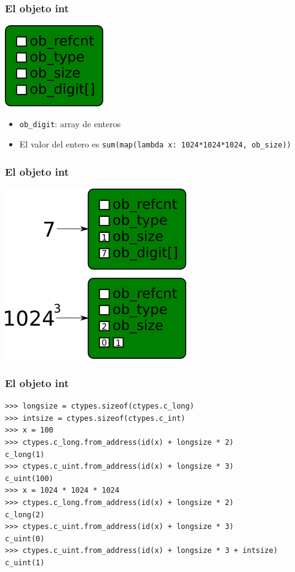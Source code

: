 \documentclass[10pt]{beamer}
\begin{document}
  \begin{frame}[containsverbatim]
    \frametitle{El objeto int}
    \begin{center}\includegraphics{img/Int.png}\end{center}
    \begin{itemize}
      \item \verb+ob_digit+: array de enteros
      \item El valor del entero es \verb+sum(map(lambda x: 1024*1024*1024, ob_size))+
    \end{itemize}
  \end{frame}

  \begin{frame}[containsverbatim]
    \frametitle{El objeto int}
    \begin{center}\includegraphics{img/Int-Usage.png}\end{center}
  \end{frame}

  \begin{frame}[containsverbatim]
    \frametitle{El objeto int}
    \begin{verbatim}
>>> longsize = ctypes.sizeof(ctypes.c_long)
>>> intsize = ctypes.sizeof(ctypes.c_int)
>>> x = 100
>>> ctypes.c_long.from_address(id(x) + longsize * 2)
c_long(1)
>>> ctypes.c_uint.from_address(id(x) + longsize * 3)
c_uint(100)
>>> x = 1024 * 1024 * 1024
>>> ctypes.c_long.from_address(id(x) + longsize * 2)
c_long(2)
>>> ctypes.c_uint.from_address(id(x) + longsize * 3)
c_uint(0)
>>> ctypes.c_uint.from_address(id(x) + longsize * 3 + intsize)
c_uint(1)
    \end{verbatim}
  \end{frame}
\end{document}
